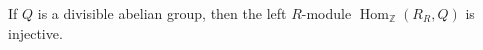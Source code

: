If $Q$ is a divisible abelian group, then the left $R$-module $\operatorname{Hom}_{\mathbb{Z}}(R_R, Q)$ is injective.
